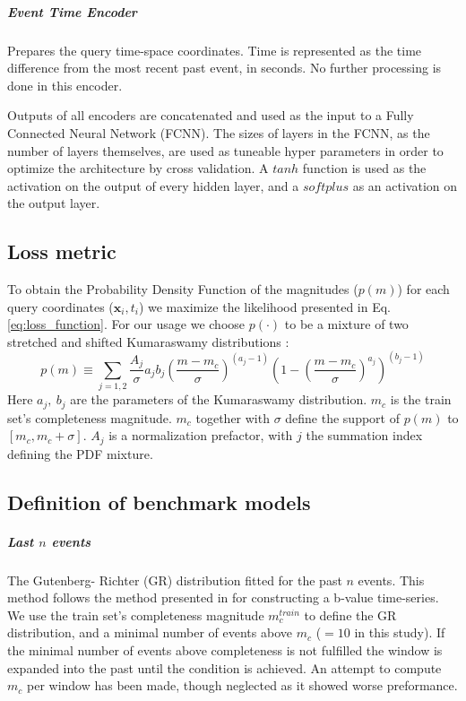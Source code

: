 \documentclass[pdflatex]{sn-jnl}
\begin{document}
\subparagraph{\textbf{Event Time Encoder}} Prepares the query time-space coordinates. Time is represented as the time difference from the most recent past event, in seconds. No further processing is done in this encoder.



Outputs of all encoders are concatenated and used as the input to a Fully Connected Neural Network (FCNN). The sizes of layers in the FCNN, as the number of layers themselves, are used as tuneable hyper parameters in order to optimize the architecture by cross validation. A $tanh$ function is used as the activation on the output of every hidden layer, and a $softplus$ as an activation on the output layer. 

\subsection{Loss metric}
To obtain the Probability Density Function of the magnitudes ($p(m)$) for each query coordinates ($\textbf{x}_i, t_i$) we maximize the likelihood presented in Eq. \ref{eq:loss_function}. For our usage we choose $p(\cdot)$ to be a mixture of two stretched and shifted Kumaraswamy distributions \cite{kumaraswamy_generalized_1980}:
\begin{equation}
    p\left( m \right)
    \equiv
    \sum_{j=1,2} \frac{A_j}{\sigma}a_jb_j\left(\frac{m-m_c}{\sigma}\right)^{\left(a_j-1\right)}\left(1-\left(\frac{m-m_c}{\sigma}\right)^{a_j}\right)^{\left(b_j-1\right)}
\end{equation}
Here $a_j, \ b_j$ are the parameters of the Kumaraswamy distribution. $m_c$ is the train set's completeness magnitude. $m_c$ together with $\sigma$ define the support of $p(m)$ to $[m_c, m_c+\sigma]$. $A_j$ is a normalization prefactor, with $j$ the summation index defining the PDF mixture.

\subsection{Definition of benchmark models}
\subparagraph{Last $n$ events} The Gutenberg- Richter (GR) distribution fitted for the past $n$ events. This method follows the method presented in \cite{gulia_real-time_2019} for constructing a b-value time-series. We use the train set's completeness magnitude $m_c^{train}$ to define the GR distribution, and a minimal number of events above $m_c$ ($=10$ in this study). If the minimal number of events above completeness is not fulfilled the window is expanded into the past until the condition is achieved. An attempt to compute $m_c$ per window has been made, though neglected as it showed worse preformance.
\end{document}
